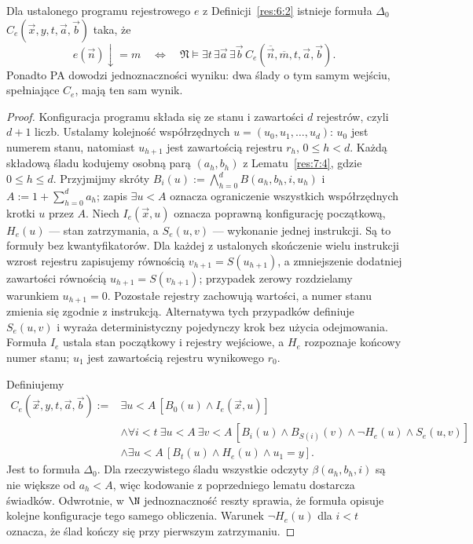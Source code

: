 \begin{lemat}\label{res:7:5}
Dla ustalonego programu rejestrowego $e$ z Definicji~\ref{res:6:2} istnieje formuła $\Delta_0$ $C_e(\vec x,y,t,\vec a,\vec b)$ taka, że
\[
e(\vec n)\downarrow=m\quad\Longleftrightarrow\quad
\mathfrak N\models\exists t\,\exists\vec a\,\exists\vec b\,
C_e(\overline{\vec n},\overline m,t,\vec a,\vec b).
\]
Ponadto PA dowodzi jednoznaczności wyniku: dwa ślady o tym samym wejściu, spełniające $C_e$, mają ten sam wynik.
\end{lemat}
\begin{proof}
Konfiguracja programu składa się ze stanu i zawartości $d$ rejestrów, czyli $d+1$ liczb. Ustalamy kolejność współrzędnych $u=(u_0,u_1,\ldots,u_d)$: $u_0$ jest numerem stanu, natomiast $u_{h+1}$ jest zawartością rejestru $r_h$, $0\le h<d$. Każdą składową śladu kodujemy osobną parą $(a_h,b_h)$ z Lematu~\ref{res:7:4}, gdzie $0\le h\le d$. Przyjmijmy skróty
$B_i(u):=\bigwedge_{h=0}^d B(a_h,b_h,i,u_h)$ i
$A:=1+\sum_{h=0}^d a_h$; zapis $\exists u<A$ oznacza ograniczenie wszystkich współrzędnych krotki $u$ przez $A$.
Niech $I_e(\vec x,u)$ oznacza poprawną konfigurację początkową, $H_e(u)$ --- stan zatrzymania, a $S_e(u,v)$ --- wykonanie jednej instrukcji. Są to formuły bez kwantyfikatorów. Dla każdej z ustalonych skończenie wielu instrukcji wzrost rejestru zapisujemy równością $v_{h+1}=S(u_{h+1})$, a zmniejszenie dodatniej zawartości równością $u_{h+1}=S(v_{h+1})$; przypadek zerowy rozdzielamy warunkiem $u_{h+1}=0$. Pozostałe rejestry zachowują wartości, a numer stanu zmienia się zgodnie z instrukcją. Alternatywa tych przypadków definiuje $S_e(u,v)$ i wyraża deterministyczny pojedynczy krok bez użycia odejmowania. Formuła $I_e$ ustala stan początkowy i rejestry wejściowe, a $H_e$ rozpoznaje końcowy numer stanu; $u_1$ jest zawartością rejestru wynikowego $r_0$.

Definiujemy
\begin{align*}
C_e(\vec x,y,t,\vec a,\vec b):={}&
\exists u<A\,[B_0(u)\land I_e(\vec x,u)]\\
&\land\forall i<t\ \exists u<A\ \exists v<A\,
[B_i(u)\land B_{S(i)}(v)\land\neg H_e(u)\land S_e(u,v)]\\
&\land\exists u<A\,[B_t(u)\land H_e(u)\land u_1=y].
\end{align*}
Jest to formuła $\Delta_0$. Dla rzeczywistego śladu wszystkie odczyty $\beta(a_h,b_h,i)$ są nie większe od $a_h<A$, więc kodowanie z poprzedniego lematu dostarcza świadków. Odwrotnie, w $\N$ jednoznaczność reszty sprawia, że formuła opisuje kolejne konfiguracje tego samego obliczenia. Warunek $\neg H_e(u)$ dla $i<t$ oznacza, że ślad kończy się przy pierwszym zatrzymaniu.


\end{proof}
